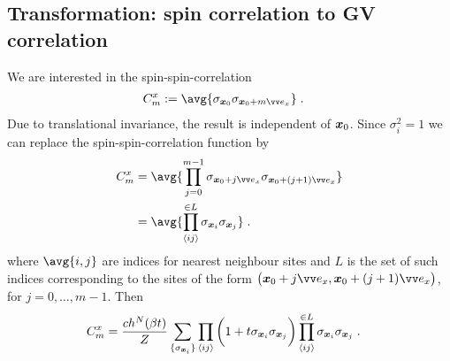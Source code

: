 \subsection{Transformation: spin correlation to  GV correlation}

We are interested in the spin-spin-correlation
%
\begin{align*}
C^{x}_{m}&:=\avg{\sigma_{\xx{0}}\sigma_{\xx{0} +m \vv e_{x}}}\;.
\end{align*}
%
Due to translational invariance, the result is independent of $\boldsymbol x_{0}$.
Since $\sigma_{i}^{2}=1$ we can replace the spin-spin-correlation function by
%
\begin{align*}
C^{x}_{m}&=\avg{\prod_{j=0}^{m-1}\sigma_{\xx{0} + j \vv e_{x}}\sigma_{\xx{0} + (j+1) \vv e_{x}}}\\
&=\avg{\prod_{\langle ij \rangle}^{\in L}\sigma_{\xx{i}} \sigma_{\xx{j}}} \;.
\end{align*}
%
where $\avg{i,j}$ are indices for nearest neighbour sites and $L$ is the set of such indices corresponding to the sites
of the form $\big(\xx{0} + j \vv e_{x}, \xx{0} + (j+1) \vv e_{x}\big)$, for $j=0,\ldots , m-1$.
Then
%
\begin{align*}
C^{x}_{m}
&=\frac{ch^{N}(\beta t)}{Z}\sum_{\{\sigma_{\boldsymbol x_{i}} \}}
\prod_{\langle ij \rangle} \bigg( 1+ t \sigma_{\boldsymbol x_{i}} \sigma_{\boldsymbol x_{j}} \bigg)
\prod_{\langle ij \rangle}^{\in L}\sigma_{\boldsymbol x_{i}} \sigma_{\boldsymbol x_{j}}\;.
\end{align*}
%

